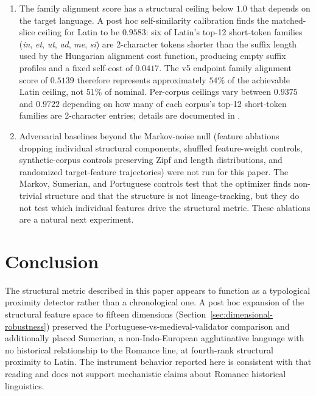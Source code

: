 \documentclass[11pt]{article}
\begin{document}
\begin{enumerate}
    caution, since some rank order changes under expansion.
    \item The family alignment score has a structural ceiling below $1.0$
    that depends on the target language. A post hoc self-similarity
    calibration finds the matched-slice ceiling for Latin to be $0.9583$:
    six of Latin's top-12 short-token families (\emph{in}, \emph{et},
    \emph{ut}, \emph{ad}, \emph{me}, \emph{si}) are 2-character tokens
    shorter than the suffix length used by the Hungarian alignment cost
    function, producing empty suffix profiles and a fixed self-cost of
    $0.0417$. The v5 endpoint family alignment score of $0.5139$ therefore
    represents approximately $54\%$ of the achievable Latin ceiling, not
    $51\%$ of nominal. Per-corpus ceilings vary between $0.9375$ and
    $0.9722$ depending on how many of each corpus's top-12 short-token
    families are 2-character entries; details are documented in
    .
    \item Adversarial baselines beyond the Markov-noise null (feature
    ablations dropping individual structural components, shuffled
    feature-weight controls, synthetic-corpus controls preserving Zipf and
    length distributions, and randomized target-feature trajectories) were
    not run for this paper. The Markov, Sumerian, and Portuguese controls
    test that the optimizer finds non-trivial structure and that the
    structure is not lineage-tracking, but they do not test which individual
    features drive the structural metric. These ablations are a natural
    next experiment.
\end{enumerate}

\section{Conclusion}

The structural metric described in this paper appears to function as a
typological proximity detector rather than a chronological one. A post hoc
expansion of the structural feature space to fifteen dimensions
(Section~\ref{sec:dimensional-robustness}) preserved the
Portuguese-vs-medieval-validator comparison and additionally placed Sumerian,
a non-Indo-European agglutinative language with no historical relationship
to the Romance line, at fourth-rank structural proximity to Latin. The
instrument behavior reported here is consistent with that reading and does
not support mechanistic claims about Romance historical linguistics.
\end{document}
